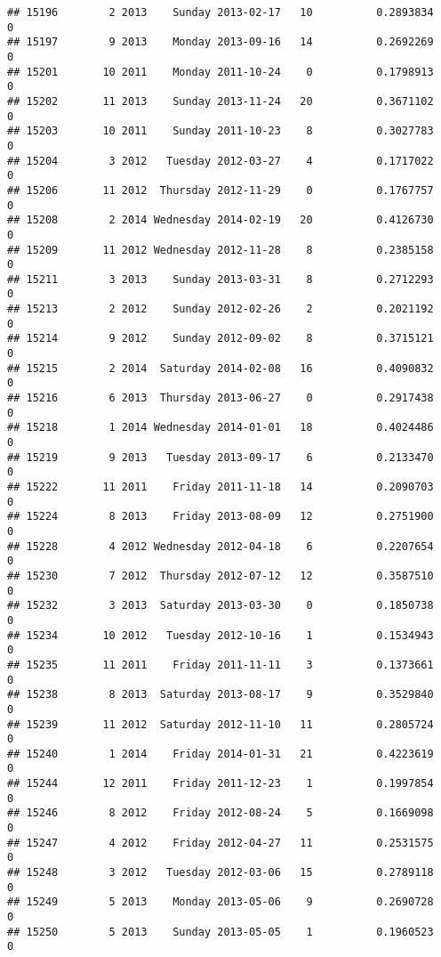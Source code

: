 \documentclass[
]{article}
\begin{document}
\begin{verbatim}
## 15196        2 2013    Sunday 2013-02-17   10          0.2893834             0
## 15197        9 2013    Monday 2013-09-16   14          0.2692269             0
## 15201       10 2011    Monday 2011-10-24    0          0.1798913             0
## 15202       11 2013    Sunday 2013-11-24   20          0.3671102             0
## 15203       10 2011    Sunday 2011-10-23    8          0.3027783             0
## 15204        3 2012   Tuesday 2012-03-27    4          0.1717022             0
## 15206       11 2012  Thursday 2012-11-29    0          0.1767757             0
## 15208        2 2014 Wednesday 2014-02-19   20          0.4126730             0
## 15209       11 2012 Wednesday 2012-11-28    8          0.2385158             0
## 15211        3 2013    Sunday 2013-03-31    8          0.2712293             0
## 15213        2 2012    Sunday 2012-02-26    2          0.2021192             0
## 15214        9 2012    Sunday 2012-09-02    8          0.3715121             0
## 15215        2 2014  Saturday 2014-02-08   16          0.4090832             0
## 15216        6 2013  Thursday 2013-06-27    0          0.2917438             0
## 15218        1 2014 Wednesday 2014-01-01   18          0.4024486             0
## 15219        9 2013   Tuesday 2013-09-17    6          0.2133470             0
## 15222       11 2011    Friday 2011-11-18   14          0.2090703             0
## 15224        8 2013    Friday 2013-08-09   12          0.2751900             0
## 15228        4 2012 Wednesday 2012-04-18    6          0.2207654             0
## 15230        7 2012  Thursday 2012-07-12   12          0.3587510             0
## 15232        3 2013  Saturday 2013-03-30    0          0.1850738             0
## 15234       10 2012   Tuesday 2012-10-16    1          0.1534943             0
## 15235       11 2011    Friday 2011-11-11    3          0.1373661             0
## 15238        8 2013  Saturday 2013-08-17    9          0.3529840             0
## 15239       11 2012  Saturday 2012-11-10   11          0.2805724             0
## 15240        1 2014    Friday 2014-01-31   21          0.4223619             0
## 15244       12 2011    Friday 2011-12-23    1          0.1997854             0
## 15246        8 2012    Friday 2012-08-24    5          0.1669098             0
## 15247        4 2012    Friday 2012-04-27   11          0.2531575             0
## 15248        3 2012   Tuesday 2012-03-06   15          0.2789118             0
## 15249        5 2013    Monday 2013-05-06    9          0.2690728             0
## 15250        5 2013    Sunday 2013-05-05    1          0.1960523             0

\end{verbatim}
\end{document}
